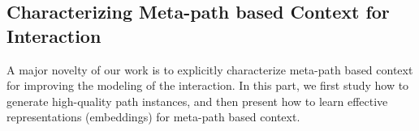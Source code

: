 

\subsection{Characterizing Meta-path based Context for Interaction}
A major novelty of our work is to explicitly characterize meta-path based context for improving the modeling of the  interaction.
In this part, we first study how to generate high-quality path instances, and then present how to learn effective representations (\ie embeddings) for meta-path based context.


